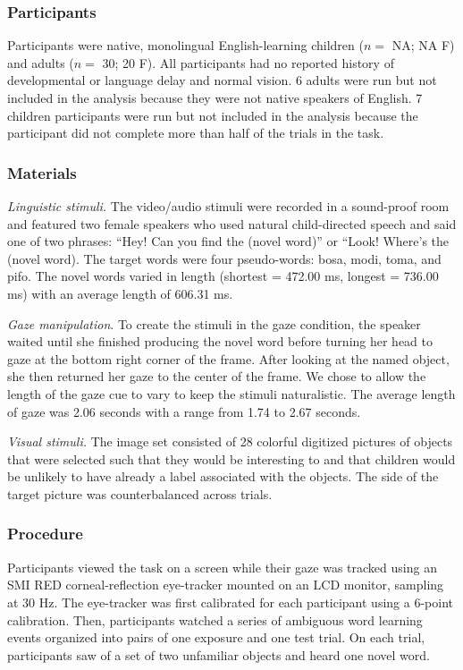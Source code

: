 \documentclass[man,floatsintext]{apa6}
\begin{document}
\subsubsection{Participants}\label{participants-2}

Participants were native, monolingual English-learning children (\(n=\)
NA; NA F) and adults (\(n=\) 30; 20 F). All participants had no reported
history of developmental or language delay and normal vision. 6 adults
were run but not included in the analysis because they were not native
speakers of English. 7 children participants were run but not included
in the analysis because the participant did not complete more than half
of the trials in the task.

\subsubsection{Materials}\label{materials-2}

\emph{Linguistic stimuli.} The video/audio stimuli were recorded in a
sound-proof room and featured two female speakers who used natural
child-directed speech and said one of two phrases: \enquote{Hey! Can you
find the (novel word)} or ``Look! Where's the (novel word). The target
words were four pseudo-words: bosa, modi, toma, and pifo. The novel
words varied in length (shortest = 472.00 ms, longest = 736.00 ms) with
an average length of 606.31 ms.

\emph{Gaze manipulation}. To create the stimuli in the gaze condition,
the speaker waited until she finished producing the novel word before
turning her head to gaze at the bottom right corner of the frame. After
looking at the named object, she then returned her gaze to the center of
the frame. We chose to allow the length of the gaze cue to vary to keep
the stimuli naturalistic. The average length of gaze was 2.06 seconds
with a range from 1.74 to 2.67 seconds.

\emph{Visual stimuli.} The image set consisted of 28 colorful digitized
pictures of objects that were selected such that they would be
interesting to and that children would be unlikely to have already a
label associated with the objects. The side of the target picture was
counterbalanced across trials.

\subsubsection{Procedure}\label{procedure-2}

Participants viewed the task on a screen while their gaze was tracked
using an SMI RED corneal-reflection eye-tracker mounted on an LCD
monitor, sampling at 30 Hz. The eye-tracker was first calibrated for
each participant using a 6-point calibration. Then, participants watched
a series of ambiguous word learning events organized into pairs of one
exposure and one test trial. On each trial, participants saw of a set of
two unfamiliar objects and heard one novel word.
\end{document}
